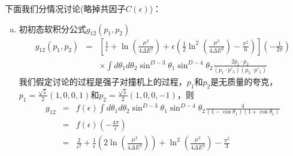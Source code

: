 下面我们分情况讨论(略掉共因子$C(\epsilon)$)：
\begin{enumerate}[(a)]
\item 初初态软积分公式$g_{12}(p_1, p_2)$
\begin{eqnarray}
g_{12}(p_1,p_2) &=& \left[\frac{1}{\epsilon} + \ln\left( \frac{\mu^2}{4\Delta E^2} \right)
+\epsilon \left( \frac{1}{2}\ln^2\left(\frac{\mu^2}{4\Delta E^2} \right) - \frac{\pi^2}{6}\right)\right]
\left(-\frac{1}{2\pi} \right)
\nonumber \\
&& \times \int d\theta_1 d\theta_2 \sin^{D-3}\theta_1\sin^{D-4}\theta_2 \frac{2p_1\cdot p_2}
{(p_1\cdot p'_5)(p_2\cdot p'_5)}
\end{eqnarray}
我们假定讨论的过程是强子对撞机上的过程，$p_1$和$p_2$是无质量的夸克，$p_1 = \frac{\sqrt{\hat s}}{2}
(1,0,0,1)$和$p_2 = \frac{\sqrt{\hat s}}{2}(1,0,0,-1)$，则
\begin{eqnarray}
g_{12} &=& f(\epsilon) \int d\theta_1 d\theta_2 \sin^{D-3}\theta_1 \sin^{D-4}\theta_2 \frac{4}
{(1-\cos\theta_1)(1+\cos\theta_1)}
\nonumber \\
&=& f(\epsilon)\left(-\frac{4\pi}{\epsilon}\right)
\nonumber \\
&=& \frac{2}{\epsilon^2} + \frac{1}{\epsilon} \left(2\ln\left(\frac{\mu^2}{4\Delta E^2}\right)\right)
+ \ln^2\left(\frac{\mu^2}{4\Delta E^2}\right) - \frac{\pi^2}{3}
\end{eqnarray}


\end{enumerate}
